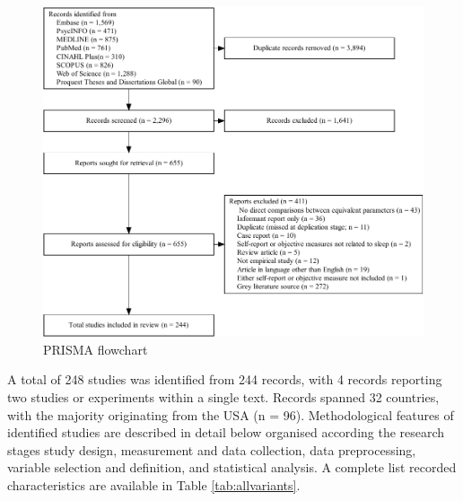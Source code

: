 \documentclass[
]{article}
\begin{document}
\begin{figure}
\centering
\includegraphics{review_markdown_files/figure-latex/PRISMA-1.pdf}
\caption{\label{fig:PRISMA}PRISMA flowchart}
\end{figure}

A total of 248 studies was identified from 244 records, with 4 records reporting two studies or experiments within a single text. Records spanned 32 countries, with the majority originating from the USA (n = 96). Methodological features of identified studies are described in detail below organised according the research stages study design, measurement and data collection, data preprocessing, variable selection and definition, and statistical analysis. A complete list recorded characteristics are available in Table \ref{tab:allvariants}.

\begingroup\fontsize{8}{10}\selectfont
\end{document}
